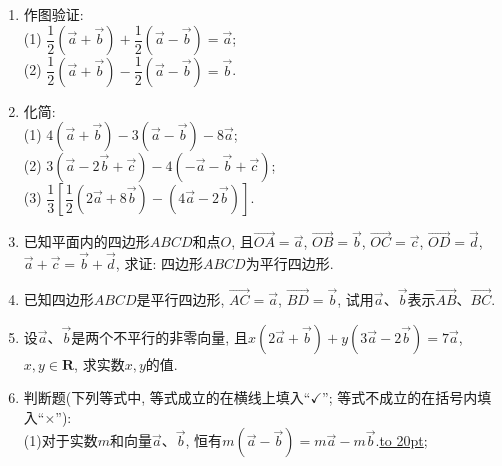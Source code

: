 \documentclass[10pt,a4paper]{article}
\newcommand{\blank}[1]{\underline{\hbox to #1pt{}}}
\begin{document}
\begin{enumerate}[1.]
\begin{center}
\end{center}
\item 作图验证:\\
(1) $\dfrac 12(\overrightarrow a+\overrightarrow b)+\dfrac 12(\overrightarrow a-\overrightarrow b)=\overrightarrow a$;\\
(2) $\dfrac 12(\overrightarrow a+\overrightarrow b)-\dfrac 12(\overrightarrow a-\overrightarrow b)=\overrightarrow b$.
\item 化简:\\
(1) $4(\overrightarrow a+\overrightarrow b)-3(\overrightarrow a-\overrightarrow b)-8\overrightarrow a$;\\
(2) $3(\overrightarrow a-2\overrightarrow b+\overrightarrow c)-4(-\overrightarrow a-\overrightarrow b+\overrightarrow c)$;\\
(3) $\dfrac 13[\dfrac 12(2\overrightarrow a+8\overrightarrow b)-(4\overrightarrow a-2\overrightarrow b)]$.
\item 已知平面内的四边形$ABCD$和点$O$, 且$\overrightarrow{OA}=\overrightarrow a$, $\overrightarrow{OB}=\overrightarrow b$, $\overrightarrow{OC}=\overrightarrow c$, $\overrightarrow{OD}=\overrightarrow d$, $\overrightarrow a+\overrightarrow c=\overrightarrow b+\overrightarrow d$, 求证: 四边形$ABCD$为平行四边形.
\item 已知四边形$ABCD$是平行四边形, $\overrightarrow{AC}=\overrightarrow a$, $\overrightarrow{BD}=\overrightarrow b$, 试用$\overrightarrow a$、$\overrightarrow b$表示$\overrightarrow{AB}$、$\overrightarrow{BC}$.
\item 设$\overrightarrow a$、$\overrightarrow b$是两个不平行的非零向量, 且$x(2\overrightarrow a+\overrightarrow b)+y(3\overrightarrow a-2\overrightarrow b)=7\overrightarrow a$, $x,y\in \mathbf{R}$, 求实数$x,y$的值.
\item 判断题(下列等式中, 等式成立的在横线上填入``$\checkmark$''; 等式不成立的在括号内填入``$\times$''):\\
(1)对于实数$m$和向量$\overrightarrow a$、$\overrightarrow b$, 恒有$m(\overrightarrow a-\overrightarrow b)=m\overrightarrow a-m\overrightarrow b$.\blank{20}; \\

\end{enumerate}
\end{document}
